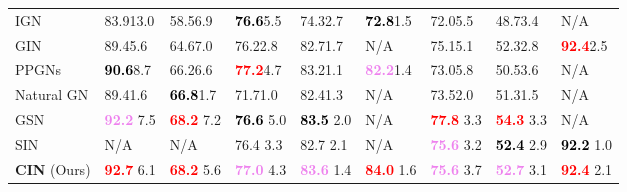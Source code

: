 \documentclass{article}
\newcommand{\first}[1]{\textbf{\textcolor{red}{#1}}}
\newcommand{\second}[1]{\textbf{\textcolor{violet}{#1}}}
\newcommand{\third}[1]{\textbf{\textcolor{black}{#1}}}
\begin{document}
\begin{table}[!t]
{\begin{tabular}{l | lllll | lll}
        IGN \citep{maron2018invariant} &
        83.913.0 &
        58.56.9 &
        \third{76.6}5.5 &
        74.32.7 & 
        \third{72.8}1.5 & 
        72.05.5 & 
        48.73.4 &
        N/A \\


        GIN \citep{GIN} & 
        89.45.6 & 
        64.67.0	& 
        76.22.8 &
        82.71.7 &
        N/A & 
        75.15.1 &
        52.32.8 &
        \first{92.4}2.5 \\

        PPGNs \citep{maron2019provably} &
        \third{90.6}8.7 &
        66.26.6 &
        \first{77.2}4.7 & 
        83.21.1 & 
        \second{82.2}1.4 &
        73.05.8 & 
        50.53.6 &
        N/A \\

        Natural GN \citep{de2020natural} &
        89.41.6 &
        \third{66.8}1.7 &
        71.71.0 &
        82.41.3 &
        N/A &
        73.52.0 &
        51.31.5 &
        N/A\\

        GSN \citep{bouritsas2020improving} &
        \second{92.2}  7.5 &
        \first{68.2}  7.2 & 
        \third{76.6}  5.0 & 
        \third{83.5}  2.0 &
        N/A & \first{77.8}  3.3 & 
        \first{54.3}  3.3 &
        N/A \\
        
        SIN \citep{bodnar2021weisfeiler} & 
        N/A  &
        N/A & 
        76.4  3.3 & 
        82.7  2.1 &
        N/A &
        \second{75.6}  3.2 & 
        \third{52.4}  2.9 &
        \third{92.2}  1.0 \\

        \midrule
        
        {{\bf CIN} (Ours)} & 
        \first{92.7}  6.1 &
        \first{68.2}  5.6 &
        \second{77.0}  4.3 &
        \second{83.6}  1.4 &
        \first{84.0}  1.6 &
        \second{75.6}  3.7 & 
        \second{52.7}  3.1 &
        \first{92.4}  2.1 \\
        
        \bottomrule

\end{tabular}
    }
\end{table}
\end{document}
